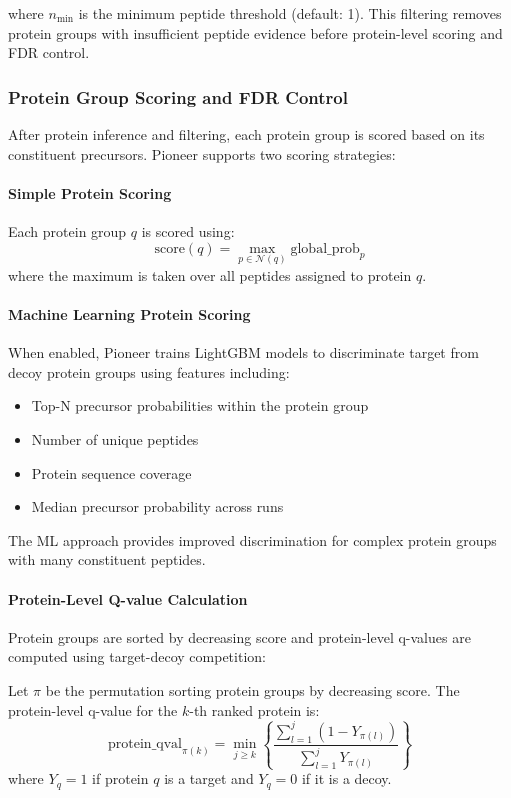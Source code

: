 \documentclass[pdflatex,sn-nature]{sn-jnl}
\begin{document}
where $n_{\text{min}}$ is the minimum peptide threshold (default: 1). This filtering removes protein groups with insufficient peptide evidence before protein-level scoring and FDR control.

\subsubsection{Protein Group Scoring and FDR Control}

After protein inference and filtering, each protein group is scored based on its constituent precursors. Pioneer supports two scoring strategies:

\paragraph{Simple Protein Scoring} Each protein group $q$ is scored using:
\begin{equation}
\text{score}(q) = \max_{p \in \mathcal{N}(q)} \text{global\_prob}_p
\end{equation}
where the maximum is taken over all peptides assigned to protein $q$.

\paragraph{Machine Learning Protein Scoring} When enabled, Pioneer trains LightGBM models to discriminate target from decoy protein groups using features including:
\begin{itemize}
  \item Top-N precursor probabilities within the protein group
  \item Number of unique peptides
  \item Protein sequence coverage
  \item Median precursor probability across runs
\end{itemize}

The ML approach provides improved discrimination for complex protein groups with many constituent peptides.

\paragraph{Protein-Level Q-value Calculation} Protein groups are sorted by decreasing score and protein-level q-values are computed using target-decoy competition:

Let $\pi$ be the permutation sorting protein groups by decreasing score. The protein-level q-value for the $k$-th ranked protein is:
\begin{equation}
\text{protein\_qval}_{\pi(k)} = \min_{j \geq k} \left\{ \frac{\sum_{l=1}^{j} (1 - Y_{\pi(l)})}{\sum_{l=1}^{j} Y_{\pi(l)}} \right\}
\end{equation}
where $Y_q = 1$ if protein $q$ is a target and $Y_q = 0$ if it is a decoy.
\end{document}
